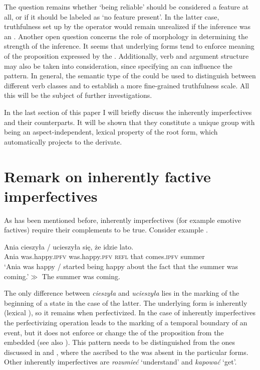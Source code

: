 \documentclass[output=paper,  modfonts,  newtxmath,  hidelinks		  ]{langscibook}
\begin{document}
The question remains whether ‘being reliable’ should be considered a feature at all, or if it should be labeled as ‘no feature present’. In the latter case, truthfulness set up by the  operator would remain unrealized if the inference was an . Another open question concerns the role of morphology in determining the strength of the inference. It seems that  underlying forms tend to enforce  meaning of the proposition expressed by the . Additionally, verb  and argument structure may also be taken into consideration, since specifying an  can influence the  pattern. In general, the semantic type of the  could be used to distinguish between different verb classes and to establish a more fine-grained truthfulness scale. All this will be the subject of further investigations.

In the last section of this paper I will briefly discuss the inherently  imperfectives and their  counterparts. It will be shown that they constitute a unique group with  being an aspect-independent, lexical property of the root form, which automatically projects to the  derivate.

\section{Remark on inherently factive imperfectives}

As has been mentioned before, inherently  imperfectives (for example emotive factives) require their complements to be true. Consider example .

\ea\label{21:inh}
\gll Ania cieszyła / ucieszyła się, że idzie lato.\\
Ania was.happy.\textsc{ipfv} {} was.happy.\textsc{pfv} \textsc{refl} that comes.\textsc{ipfv} summer\\
\glt	`Ania was happy / started being happy about the fact that the summer was coming.'\newline$\gg$ The summer was coming.
\z

\noindent The only difference between \textit{cieszyła} and \textit{ucieszyła} lies in the marking of the beginning of a state in the case of the latter. The underlying  form is inherently  (lexical ), so it remains  when perfectivized. In the case of inherently  imperfectives the perfectivizing operation leads to the marking of a temporal boundary of an event, but it does not enforce or change the  of the proposition from the embedded  (see also ). This pattern needs to be distinguished from the ones discussed in  and , where the  ascribed to the  was absent in the particular  forms. Other inherently  imperfectives are \textit{rozumieć} `understand’ and \textit{kapować} `get’.
\end{document}
